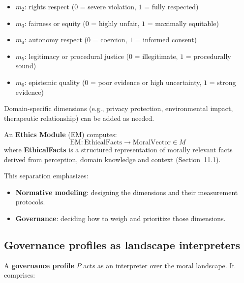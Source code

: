 \documentclass[11pt]{article}
\begin{document}
\begin{itemize}
  \item $m_2$: rights respect ($0$ = severe violation, $1$ = fully respected)
  \item $m_3$: fairness or equity ($0$ = highly unfair, $1$ = maximally equitable)
  \item $m_4$: autonomy respect ($0$ = coercion, $1$ = informed consent)
  \item $m_5$: legitimacy or procedural justice ($0$ = illegitimate, $1$ = procedurally sound)
  \item $m_6$: epistemic quality ($0$ = poor evidence or high uncertainty, $1$ = strong evidence)
\end{itemize}

Domain-specific dimensions (e.g., privacy protection, environmental impact, therapeutic relationship) can be added as needed.

An \textbf{Ethics Module} (EM) computes:
\[
  \mathrm{EM} \colon \mathrm{EthicalFacts} \to \mathrm{MoralVector} \in M
\]
where \textbf{EthicalFacts} is a structured representation of morally relevant facts derived from perception, domain knowledge and context (Section~11.1).

This separation emphasizes:
\begin{itemize}
  \item \textbf{Normative modeling}: designing the dimensions and their measurement protocols.
  \item \textbf{Governance}: deciding how to weigh and prioritize those dimensions.
\end{itemize}

\subsection{Governance profiles as landscape interpreters}

A \textbf{governance profile} $P$ acts as an interpreter over the moral landscape. It comprises:
\end{document}
